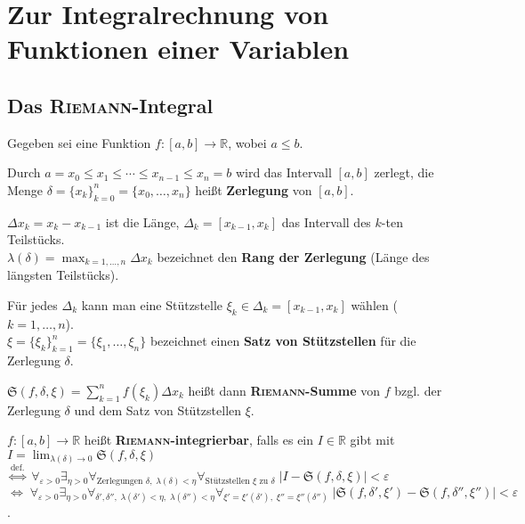 \section{%
    Zur Integralrechnung von Funktionen einer Variablen%
}

\subsection{%
    Das \textsc{Riemann}-Integral%
}

Gegeben sei eine Funktion $f: [a,b] \rightarrow \mathbb{R}$, wobei $a \le b$.

Durch $a = x_0 \le x_1 \le \cdots \le x_{n-1} \le x_n = b$ wird das Intervall
$[a,b]$ zerlegt, die Menge $\delta = \{x_k\}_{k=0}^n = \{x_0, \ldots, x_n\}$
heißt \textbf{Zerlegung} von $[a,b]$.

$\Delta x_k = x_k - x_{k-1}$ ist die Länge, $\Delta_k = [x_{k-1}, x_k]$ das
Intervall des $k$-ten Teilstücks.\\
$\lambda(\delta) = \max_{k=1,\ldots,n} \Delta x_k$ bezeichnet den
\textbf{Rang der Zerlegung} (Länge des längsten Teilstücks).

Für jedes $\Delta_k$ kann man eine Stützstelle
$\xi_k \in \Delta_k = [x_{k-1}, x_k]$ wählen ($k = 1, \ldots, n$). \\
$\xi = \{\xi_k\}_{k=1}^n = \{\xi_1, \ldots, \xi_n\}$ bezeichnet einen
\textbf{Satz von Stützstellen} für die Zerlegung $\delta$.

$\mathfrak{S}(f, \delta, \xi) = \sum_{k=1}^n f(\xi_k) \Delta x_k$ heißt dann
\textbf{\textsc{Riemann}-Summe} von $f$ bzgl. der Zerlegung $\delta$ und dem
Satz von Stützstellen $\xi$.

\linie

$f: [a,b] \rightarrow \mathbb{R}$ heißt \textbf{\textsc{Riemann}-integrierbar},
falls es ein $I \in \mathbb{R}$ gibt mit
$I = \lim_{\lambda(\delta) \to 0} \mathfrak{S}(f, \delta, \xi)$ \\
$\overset{\text{def.}}{\Leftrightarrow}\;
\forall_{\varepsilon > 0}
\exists_{\eta > 0}
\forall_{\text{Zerlegungen } \delta,\; \lambda(\delta) < \eta}
\forall_{\text{Stützstellen } \xi \text{ zu } \delta}\;
|I - \mathfrak{S}(f, \delta, \xi)| < \varepsilon$ \\
$\Leftrightarrow\;
\forall_{\varepsilon > 0}
\exists_{\eta > 0}
\forall_{\delta', \delta'',\; \lambda(\delta') < \eta,\;
\lambda(\delta'') < \eta}
\forall_{\xi' = \xi'(\delta'),\; \xi'' = \xi''(\delta'')}\;
|\mathfrak{S}(f, \delta', \xi') - \mathfrak{S}(f, \delta'', \xi'')|
< \varepsilon$.

